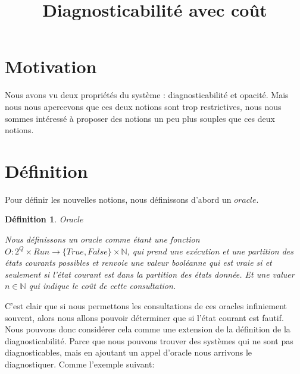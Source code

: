 \documentclass[a4paper,10pt]{article}
\title{Diagnosticabilit\'e avec co\^ut}
\newtheorem{mydef}{D\'efinition}
\begin{document}
\section{Motivation}

Nous avons vu deux propri\'et\'es du syst\`eme : diagnosticabilit\'e et opacit\'e. Mais nous nous apercevons que ces deux notions sont trop restrictives, nous nous sommes int\'eress\'e \`a proposer des notions un peu plus souples que ces deux notions.

\section{D\'efinition}

Pour d\'efinir les nouvelles notions, nous d\'efinissons d'abord un $oracle$.

\begin{mydef}{Oracle}

  Nous d\'efinissons un oracle comme \'etant une fonction $O: 2^Q\times Run \to \{True, False\} \times \mathbb{N}$, qui prend une ex\'ecution et une partition des \'etats courants possibles et renvoie une valeur bool\'eanne qui est vraie si et seulement si l'\'etat courant est dans la partition des \'etats donn\'ee. Et une valuer $n \in \mathbb{N}$ qui indique le co\^ut de cette consultation.

\end{mydef}

C'est clair que si nous permettons les consultations de ces oracles infiniement souvent, alors nous allons pouvoir d\'eterminer que si l'\'etat courant est fautif. Nous pouvons donc consid\'erer cela comme une extension de la d\'efinition de la diagnosticabilit\'e. Parce que nous pouvons trouver des syst\`emes qui ne sont pas diagnosticables, mais en ajoutant un appel d'oracle nous arrivons le diagnostiquer. Comme l'exemple suivant:

\begin{figure}[H]
  \begin{center}
  \end{center}
\end{figure}
\end{document}
